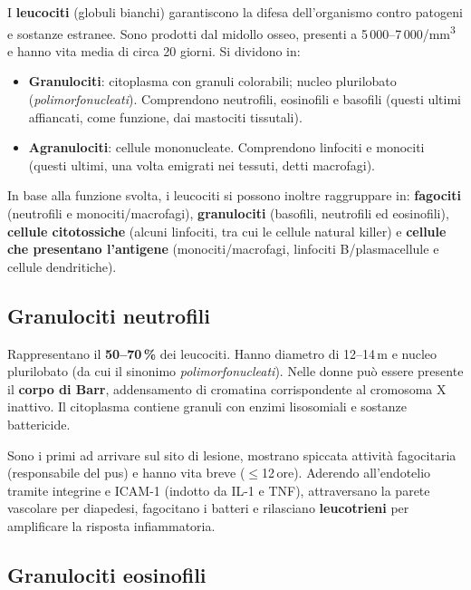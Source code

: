 I \textbf{leucociti} (globuli bianchi) garantiscono la difesa dell'organismo
contro patogeni e sostanze estranee. Sono prodotti dal midollo osseo, presenti
a 5\,000--7\,000/mm\textsuperscript{3} e hanno vita media di circa 20 giorni.
Si dividono in:

\begin{itemize}
  \item \textbf{Granulociti}: citoplasma con granuli colorabili; nucleo
    plurilobato (\textit{polimorfonucleati}). Comprendono neutrofili, eosinofili
    e basofili (questi ultimi affiancati, come funzione, dai mastociti
    tissutali).
  \item \textbf{Agranulociti}: cellule mononucleate. Comprendono linfociti e
    monociti (questi ultimi, una volta emigrati nei tessuti, detti macrofagi).
\end{itemize}

In base alla funzione svolta, i leucociti si possono inoltre raggruppare in:
\textbf{fagociti} (neutrofili e monociti/macrofagi), \textbf{granulociti}
(basofili, neutrofili ed eosinofili), \textbf{cellule citotossiche} (alcuni
linfociti, tra cui le cellule natural killer) e \textbf{cellule che
presentano l'antigene} (monociti/macrofagi, linfociti B/plasmacellule e
cellule dendritiche).

\subsection{Granulociti neutrofili}

Rappresentano il \textbf{50--70\,\%} dei leucociti. Hanno diametro di
12--14\,\textmu m e nucleo plurilobato (da cui il sinonimo
\textit{polimorfonucleati}). Nelle donne può essere presente il
\textbf{corpo di Barr}, addensamento di cromatina corrispondente al cromosoma X
inattivo. Il citoplasma contiene granuli con enzimi lisosomiali e sostanze
battericide.

Sono i primi ad arrivare sul sito di lesione, mostrano spiccata attività
fagocitaria (responsabile del pus) e hanno vita breve ($\leq$12\,ore). Aderendo
all'endotelio tramite integrine e ICAM-1 (indotto da IL-1 e TNF), attraversano
la parete vascolare per diapedesi, fagocitano i batteri e rilasciano
\textbf{leucotrieni} per amplificare la risposta infiammatoria.

\subsection{Granulociti eosinofili}

